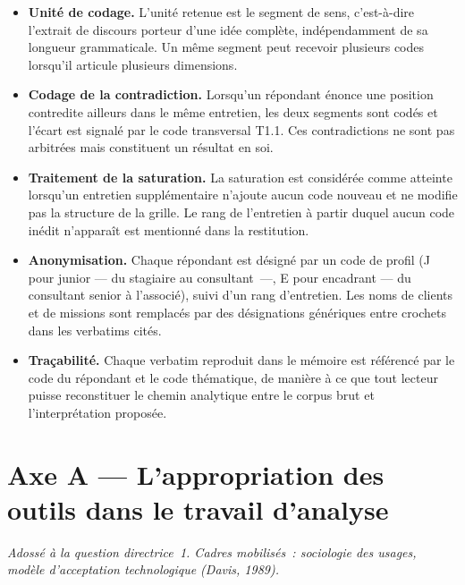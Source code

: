 \begin{itemize}
    \item \textbf{Unité de codage.} L'unité retenue est le segment de sens, c'est-à-dire
    l'extrait de discours porteur d'une idée complète, indépendamment de sa longueur
    grammaticale. Un même segment peut recevoir plusieurs codes lorsqu'il articule
    plusieurs dimensions.

    \item \textbf{Codage de la contradiction.} Lorsqu'un répondant énonce une position
    contredite ailleurs dans le même entretien, les deux segments sont codés et
    l'écart est signalé par le code transversal T1.1. Ces contradictions ne sont pas
    arbitrées mais constituent un résultat en soi.

    \item \textbf{Traitement de la saturation.} La saturation est considérée comme
    atteinte lorsqu'un entretien supplémentaire n'ajoute aucun code nouveau et ne
    modifie pas la structure de la grille. Le rang de l'entretien à partir duquel
    aucun code inédit n'apparaît est mentionné dans la restitution.

    \item \textbf{Anonymisation.} Chaque répondant est désigné par un code de profil
    (J pour junior --- du stagiaire au consultant~---, E pour encadrant --- du consultant
    senior à l'associé), suivi
    d'un rang d'entretien. Les noms de clients et de missions sont remplacés par des
    désignations génériques entre crochets dans les verbatims cités.

    \item \textbf{Traçabilité.} Chaque verbatim reproduit dans le mémoire est référencé
    par le code du répondant et le code thématique, de manière à ce que tout lecteur
    puisse reconstituer le chemin analytique entre le corpus brut et l'interprétation
    proposée.
\end{itemize}

\section{Axe A --- L'appropriation des outils dans le travail d'analyse}

\textit{Adossé à la question directrice~1. Cadres mobilisés~: sociologie des usages,
modèle d'acceptation technologique (Davis, 1989).}

